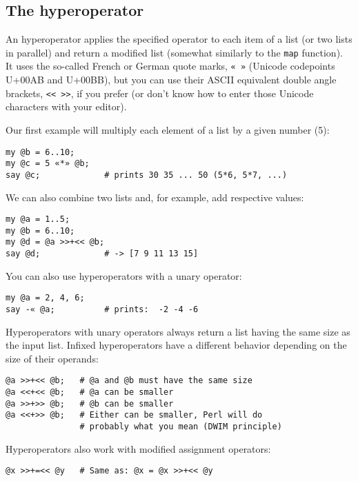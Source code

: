 \subsection{The hyperoperator}

An hyperoperator applies the specified operator to each 
item of a list (or two lists in parallel) and return a 
modified list (somewhat similarly to the {\tt map} 
function). It uses the so-called French or German 
quote marks, \verb'« »' (Unicode codepoints U+00AB 
and U+00BB), but you can use their ASCII equivalent 
double angle brackets, \verb'<< >>', if you prefer 
(or don't know how to enter those Unicode characters 
with your editor).

Our first example will multiply each element of a list 
by a given number (5):

\begin{verbatim}
my @b = 6..10;
my @c = 5 «*» @b;
say @c;             # prints 30 35 ... 50 (5*6, 5*7, ...)
\end{verbatim}

We can also combine two lists and, for example, add 
respective values:

\begin{verbatim}
my @a = 1..5;
my @b = 6..10;
my @d = @a >>+<< @b;
say @d;             # -> [7 9 11 13 15]
\end{verbatim}

You can also use hyperoperators with a unary operator:

\begin{verbatim}
my @a = 2, 4, 6;
say -« @a;          # prints:  -2 -4 -6
\end{verbatim}

Hyperoperators with unary operators always return a 
list having the same size as the input list. Infixed 
hyperoperators have a different behavior depending on 
the size of their operands:

\begin{verbatim}
@a >>+<< @b;   # @a and @b must have the same size
@a <<+<< @b;   # @a can be smaller
@a >>+>> @b;   # @b can be smaller
@a <<+>> @b;   # Either can be smaller, Perl will do 
               # probably what you mean (DWIM principle)
\end{verbatim}

Hyperoperators also work with modified assignment 
operators:

\begin{verbatim}
@x >>+=<< @y   # Same as: @x = @x >>+<< @y
\end{verbatim}

